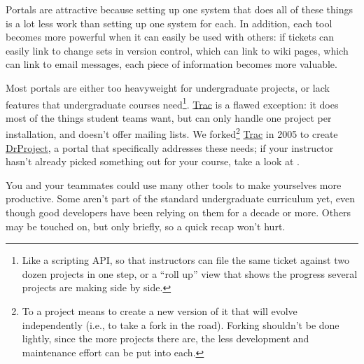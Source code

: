 \documentclass{report}
\begin{document}
Portals are attractive because setting up one system that does all of
these things is a lot less work than setting up one system for each.
In addition, each tool becomes more powerful when it can easily be
used with others: if tickets can easily link to change sets in version
control, which can link to wiki pages, which can link to email
messages, each piece of information becomes more valuable.

Most portals are either too heavyweight for undergraduate projects, or
lack features that undergraduate courses need\footnote{Like a
scripting API, so that instructors can file the same ticket against
two dozen projects in one step, or a ``roll up'' view that shows the
progress several projects are making side by side.}.  \url{Trac} is a
flawed exception: it does most of the things student teams want, but
can only handle one project per installation, and doesn't offer
mailing lists.  We forked\footnote{To  a project means
to create a new version of it that will evolve independently (i.e., to
take a fork in the road).  Forking shouldn't be done lightly, since
the more projects there are, the less development and maintenance
effort can be put into each.} \url{Trac} in 2005 to create
\url{DrProject}, a portal that specifically addresses these needs; if
your instructor hasn't already picked something out for your course,
take a look at .


You and your teammates could use many other tools to make yourselves
more productive.  Some aren't part of the standard undergraduate
curriculum yet, even though good developers have been relying on them
for a decade or more.  Others may be touched on, but only briefly, so
a quick recap won't hurt.
\end{document}
